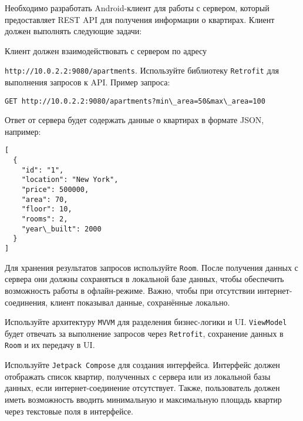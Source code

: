 \documentclass[a4paper,12pt]{article}
\begin{document}
Необходимо разработать Android-клиент для работы с сервером, который предоставляет REST API для получения информации о квартирах. Клиент должен выполнять следующие задачи:

Клиент должен взаимодействовать с сервером по адресу 

\texttt{http://10.0.2.2:9080/apartments}. Используйте библиотеку \texttt{Retrofit} для выполнения запросов к API. Пример запроса:

\begin{verbatim}
GET http://10.0.2.2:9080/apartments?min\_area=50&max\_area=100
\end{verbatim}

Ответ от сервера будет содержать данные о квартирах в формате JSON, например:

\begin{verbatim}
[
  {
    "id": "1",
    "location": "New York",
    "price": 500000,
    "area": 70,
    "floor": 10,
    "rooms": 2,
    "year\_built": 2000
  }
]
\end{verbatim}

Для хранения результатов запросов используйте \texttt{Room}. После получения данных с сервера они должны сохраняться в локальной базе данных, чтобы обеспечить возможность работы в офлайн-режиме. Важно, чтобы при отсутствии интернет-соединения, клиент показывал данные, сохранённые локально.

Используйте архитектуру \texttt{MVVM} для разделения бизнес-логики и UI. \texttt{ViewModel} будет отвечать за выполнение запросов через \texttt{Retrofit}, сохранение данных в \texttt{Room} и их передачу в UI.

Используйте \texttt{Jetpack Compose} для создания интерфейса. Интерфейс должен отображать список квартир, полученных с сервера или из локальной базы данных, если интернет-соединение отсутствует. Также, пользователь должен иметь возможность вводить минимальную и максимальную площадь квартир через текстовые поля в интерфейсе.
\end{document}
